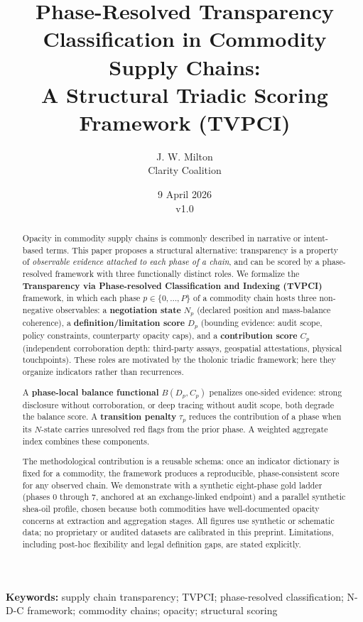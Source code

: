 \documentclass[12pt]{article}
\title{Phase-Resolved Transparency Classification in Commodity Supply Chains:\\
\large A Structural Triadic Scoring Framework (TVPCI)}
\author{J. W. Milton\\[4pt]{\small Clarity Coalition}}
\date{\small 9 April 2026 \\ v1.0}
\begin{document}
\maketitle

\noindent\textbf{Keywords:} supply chain transparency; TVPCI; phase-resolved classification; N-D-C framework; commodity chains; opacity; structural scoring

\begin{abstract}
Opacity in commodity supply chains is commonly described in narrative or
intent-based terms. This paper proposes a structural alternative:
transparency is a property of \emph{observable evidence attached to each
phase of a chain}, and can be scored by a phase-resolved framework with
three functionally distinct roles. We formalize the \textbf{Transparency
via Phase-resolved Classification and Indexing (TVPCI)} framework, in
which each phase \(p \in \{0,\ldots,P\}\) of a commodity chain hosts
three non-negative observables: a \textbf{negotiation state} \(N_p\)
(declared position and mass-balance coherence), a
\textbf{definition/limitation score} \(D_p\) (bounding evidence: audit
scope, policy constraints, counterparty opacity caps), and a
\textbf{contribution score} \(C_p\) (independent corroboration depth:
third-party assays, geospatial attestations, physical touchpoints).
These roles are motivated by the tholonic triadic framework; here they
organize indicators rather than recurrences.

A \textbf{phase-local balance functional} \(B(D_p, C_p)\) penalizes
one-sided evidence: strong disclosure without corroboration, or deep
tracing without audit scope, both degrade the balance score. A
\textbf{transition penalty} \(\tau_p\) reduces the contribution of a
phase when its \(N\)-state carries unresolved red flags from the prior
phase. A weighted aggregate index combines these components.

The methodological contribution is a reusable schema: once an indicator
dictionary is fixed for a commodity, the framework produces a
reproducible, phase-consistent score for any observed chain. We
demonstrate with a synthetic eight-phase gold ladder (phases 0 through
7, anchored at an exchange-linked endpoint) and a parallel synthetic
shea-oil profile, chosen because both commodities have well-documented
opacity concerns at extraction and aggregation stages. All figures use
synthetic or schematic data; no proprietary or audited datasets are
calibrated in this preprint. Limitations, including post-hoc flexibility
and legal definition gaps, are stated explicitly.
\end{abstract}
\end{document}
